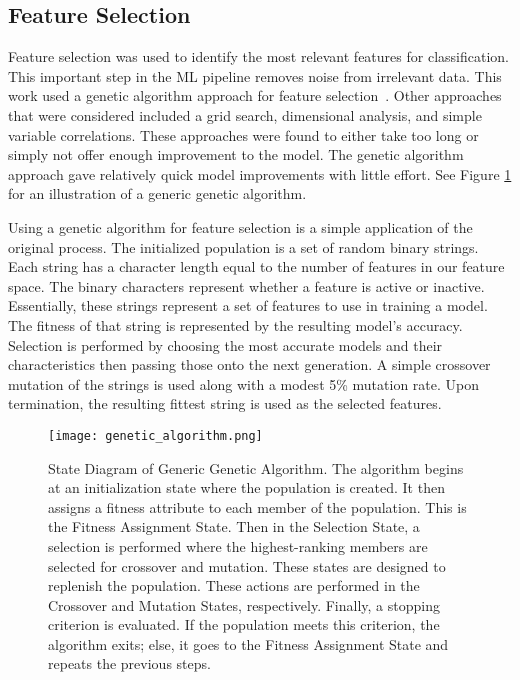 \subsection{Feature Selection}
Feature selection was used to identify the most relevant features for classification.
This important step in the \ac{ML} pipeline removes noise from irrelevant data.
This work used a genetic algorithm approach for feature selection~\cite{yang1998feature}.
Other approaches that were considered included a grid search, dimensional analysis, and simple variable correlations.
These approaches were found to either take too long or simply not offer enough improvement to the model.
The genetic algorithm approach gave relatively quick model improvements with little effort.
See Figure \ref{fig:genetic} for an illustration of a generic genetic algorithm.

\par
Using a genetic algorithm for feature selection is a simple application of the original process.
The initialized population is a set of random binary strings.
Each string has a character length equal to the number of features in our feature space.
The binary characters represent whether a feature is active or inactive.
Essentially, these strings represent a set of features to use in training a model.
The fitness of that string is represented by the resulting model's accuracy.
Selection is performed by choosing the most accurate models and their characteristics then passing those onto the next generation.
A simple crossover mutation of the strings is used along with a modest 5\% mutation rate.
Upon termination, the resulting fittest string is used as the selected features.


\begin{figure}[htp]
    \centering
    \texttt{[image: genetic\_algorithm.png]}
    \caption{State Diagram of Generic Genetic Algorithm.
    The algorithm begins at an initialization state where the population is created.
    It then assigns a fitness attribute to each member of the population.
    This is the Fitness Assignment State.
    Then in the Selection State, a selection is performed where the highest-ranking members are selected for crossover and mutation.
    These states are designed to replenish the population.
    These actions are performed in the Crossover and Mutation States, respectively.
    Finally, a stopping criterion is evaluated.
    If the population meets this criterion, the algorithm exits; else, it goes to the Fitness Assignment State and repeats the previous steps.}
    \label{fig:genetic}
\end{figure}

